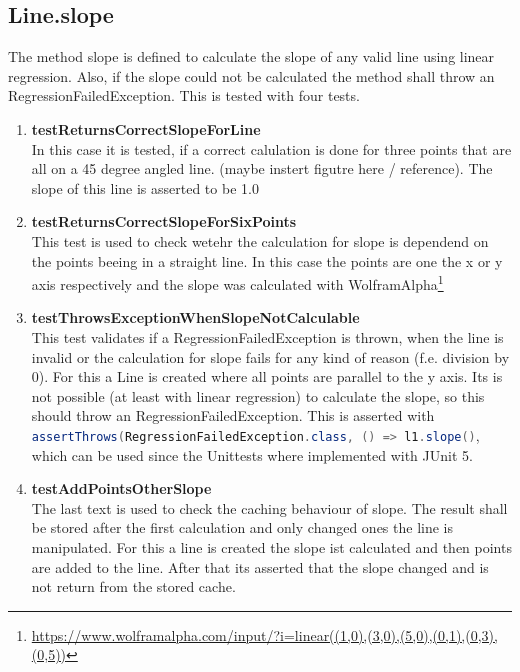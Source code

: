 \subsection{Line.slope}
The method slope is defined to calculate the slope of any valid line using linear regression. Also, if the slope could not be calculated the method shall throw an RegressionFailedException. This is tested with four tests.
\begin{enumerate}
    \item \textbf{testReturnsCorrectSlopeForLine} \\
    In this case it is tested, if a correct calulation is done for three points that are all on a 45 degree angled line. (maybe instert figutre here / reference). The slope of this line is asserted to be 1.0
    \item \textbf{testReturnsCorrectSlopeForSixPoints} \\
    This test is used to check wetehr the calculation for slope is dependend on the points beeing in a straight line. In this case the points are one the x or y axis respectively and the slope was calculated with WolframAlpha\footnote{\url{https://www.wolframalpha.com/input/?i=linear((1,0),(3,0),(5,0),(0,1),(0,3),(0,5))}}
    \item \textbf{testThrowsExceptionWhenSlopeNotCalculable} \\
    This test validates if a RegressionFailedException is thrown, when the line is invalid or the calculation for slope fails for any kind of reason (f.e. division by 0). For this a Line is created where all points are parallel to the y axis. Its is not possible (at least with linear regression) to calculate the slope, so this should throw an RegressionFailedException. This is asserted with \lstinline[language=java]{assertThrows(RegressionFailedException.class, () => l1.slope()}, which can be used since the Unittests where implemented with JUnit 5.
    \item \textbf{testAddPointsOtherSlope} \\
    The last text is used to check the caching behaviour of slope. The result shall be stored after the first calculation and only changed ones the line is manipulated. For this a line is created the slope ist calculated and then points are added to the line. After that its asserted that the slope changed and is not return from the stored cache.
\end{enumerate}

